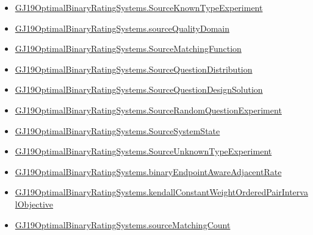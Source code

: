 \documentclass[10pt]{article}
\begin{document}
\begin{itemize}[leftmargin=1.2em]
\begin{itemize}[leftmargin=1.2em]
\item \hyperlink{paper-prerequisite-51b089a52fad3653}{GJ19\allowbreak{}Optimal\allowbreak{}Binary\allowbreak{}Rating\allowbreak{}Systems.\allowbreak{}Source\allowbreak{}Known\allowbreak{}Type\allowbreak{}Experiment}
\item \hyperlink{paper-prerequisite-af47d0cb57cea27a}{GJ19\allowbreak{}Optimal\allowbreak{}Binary\allowbreak{}Rating\allowbreak{}Systems.\allowbreak{}source\allowbreak{}Quality\allowbreak{}Domain}
\item \hyperlink{paper-prerequisite-ce2cfe64efdb0370}{GJ19\allowbreak{}Optimal\allowbreak{}Binary\allowbreak{}Rating\allowbreak{}Systems.\allowbreak{}Source\allowbreak{}Matching\allowbreak{}Function}
\item \hyperlink{paper-prerequisite-191bf99db32825ac}{GJ19\allowbreak{}Optimal\allowbreak{}Binary\allowbreak{}Rating\allowbreak{}Systems.\allowbreak{}Source\allowbreak{}Question\allowbreak{}Distribution}
\item \hyperlink{paper-prerequisite-28d0d2252a40e7be}{GJ19\allowbreak{}Optimal\allowbreak{}Binary\allowbreak{}Rating\allowbreak{}Systems.\allowbreak{}Source\allowbreak{}Question\allowbreak{}Design\allowbreak{}Solution}
\item \hyperlink{paper-prerequisite-7a235f61a510cc28}{GJ19\allowbreak{}Optimal\allowbreak{}Binary\allowbreak{}Rating\allowbreak{}Systems.\allowbreak{}Source\allowbreak{}Random\allowbreak{}Question\allowbreak{}Experiment}
\item \hyperlink{paper-prerequisite-f367c7dfa94eb0ae}{GJ19\allowbreak{}Optimal\allowbreak{}Binary\allowbreak{}Rating\allowbreak{}Systems.\allowbreak{}Source\allowbreak{}System\allowbreak{}State}
\item \hyperlink{paper-prerequisite-33ac630281f790d7}{GJ19\allowbreak{}Optimal\allowbreak{}Binary\allowbreak{}Rating\allowbreak{}Systems.\allowbreak{}Source\allowbreak{}Unknown\allowbreak{}Type\allowbreak{}Experiment}
\item \hyperlink{paper-prerequisite-a9dcc8b00689fd3f}{GJ19\allowbreak{}Optimal\allowbreak{}Binary\allowbreak{}Rating\allowbreak{}Systems.\allowbreak{}binary\allowbreak{}Endpoint\allowbreak{}Aware\allowbreak{}Adjacent\allowbreak{}Rate}
\item \hyperlink{paper-prerequisite-4c8033d6a0625382}{GJ19\allowbreak{}Optimal\allowbreak{}Binary\allowbreak{}Rating\allowbreak{}Systems.\allowbreak{}kendall\allowbreak{}Constant\allowbreak{}Weight\allowbreak{}Ordered\allowbreak{}Pair\allowbreak{}Interval\allowbreak{}Objective}
\item \hyperlink{paper-prerequisite-a3b921ca872c7645}{GJ19\allowbreak{}Optimal\allowbreak{}Binary\allowbreak{}Rating\allowbreak{}Systems.\allowbreak{}source\allowbreak{}Matching\allowbreak{}Count}

\end{itemize}
\end{itemize}
\end{document}
